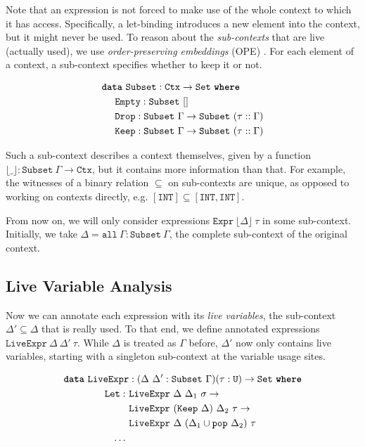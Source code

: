 \documentclass[sigplan,nonacm,screen]{acmart}
\newcommand{\I}[1]{\texttt{#1}\xspace}
\newcommand{\K}[1]{\textbf{\texttt{#1}}\xspace}
\newcommand{\Floor}[1]{\lfloor #1 \rfloor\xspace}
\begin{document}
Note that an expression is not forced to make use of the whole context to which it has access.
Specifically, a let-binding introduces a new element into the context, but it might never be used.
To reason about the \emph{sub-contexts} that are live (actually used),
we use \emph{order-preserving embeddings} (OPE) \cite{chapman2009type}.
For each element of a context, a sub-context specifies whether to keep it or not.

\begin{align*}
  &\K{data}\ \I{Subset} : \I{Ctx} \to \I{Set}\ \K{where}          \\
  &\ \ \ \ \I{Empty} : \I{Subset}\ []                                    \\
  &\ \ \ \ \I{Drop}  : \I{Subset}\ \Gamma \to \I{Subset}\ (\tau :: \Gamma)  \\
  &\ \ \ \ \I{Keep}  : \I{Subset}\ \Gamma \to \I{Subset}\ (\tau :: \Gamma)
\end{align*}

Such a sub-context describes a context themselves,
given by a function $\Floor{\_} : \I{Subset}\ \Gamma \to \I{Ctx}$,
but it contains more information than that.
For example, the witnesses of a binary relation $\subseteq$ on sub-contexts are unique,
as opposed to working on contexts directly, e.g. $[\I{INT}] \subseteq [\I{INT}, \I{INT}]$.

From now on, we will only consider expressions
$\I{Expr}\ \Floor{\Delta}\ \tau$ in some sub-context.
Initially, we take $\Delta = \I{all}\ \Gamma : \I{Subset}\ \Gamma$,
the complete sub-context of the original context.

\subsection{Live Variable Analysis}

Now we can annotate each expression with its \emph{live variables},
the sub-context $\Delta' \subseteq \Delta$ that is really used.
To that end, we define annotated expressions $\I{LiveExpr}\ \Delta\ \Delta'\ \tau$.
While $\Delta$ is treated as $\Gamma$ before, $\Delta'$ now only contains live variables,
starting with a singleton sub-context at the variable usage sites.

\begin{align*}
  \K{data}\ \I{LiveExpr}& : (\Delta\ \Delta' : \I{Subset}\ \Gamma) (\tau : \I{U}) \to \I{Set}\ \K{where} \\
  \I{Let}
    :\ &\I{LiveExpr}\ \Delta\ \Delta_1\ \sigma \to  \\
       &\I{LiveExpr}\ (\I{Keep}\ \Delta)\ \Delta_2\ \tau \to  \\
       &\I{LiveExpr}\ \Delta\ (\Delta_1 \cup \I{pop}\ \Delta_2)\ \tau  \\
    \ldots\ &
\end{align*}
\end{document}
